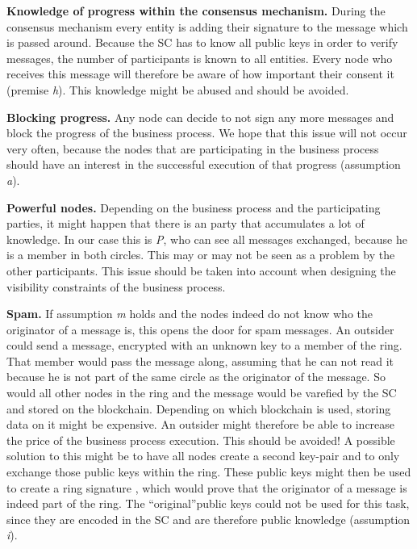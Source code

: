 \documentclass[runningheads]{llncs}
\newcommand{\ber}[1]{\textit{#1}}
\renewcommand{\bigbreak}{}
\newcommand{\quotel}{``}
\newcommand{\quoter}{''}
\begin{document}
\bigbreak
\textbf{Knowledge of progress within the consensus mechanism.} During the consensus mechanism every entity is adding their signature to the message which is passed around. Because the SC has to know all public keys in order to verify messages, the number of participants is known to all entities. Every node who receives this message will therefore be aware of how important their consent it (premise \ber{h}). This knowledge might be abused and should be avoided.


\bigbreak
\textbf{Blocking progress.} Any node can decide to not sign any more messages and block the progress of the business process. We hope that this issue will not occur very often, because the nodes that are participating in the business process should have an interest in the successful execution of that progress (assumption \ber{a}).


\bigbreak
\textbf{Powerful nodes.} Depending on the business process and the participating parties, it might happen that there is an party that accumulates a lot of knowledge. In our case this is \ber{P}, who can see all messages exchanged, because he is a member in both circles. This may or may not be seen as a problem by the other participants. This issue should be taken into account when designing the visibility constraints of the business process. 


\bigbreak
\textbf{Spam.} If assumption \ber{m} holds and the nodes indeed do not know who the originator of a message is, this opens the door for spam messages. An outsider could send a message, encrypted with an unknown key to a member of the ring. That member would pass the message along, assuming that he can not read it because he is not part of the same circle as the originator of the message. So would all other nodes in the ring and the message would be varefied by the SC and stored on the blockchain. Depending on which blockchain is used, storing data on it might be expensive. An outsider might therefore be able to increase the price of the business process execution. This should be avoided! A possible solution to this might be to have all nodes create a second key-pair and to only exchange those public keys within the ring. These public keys might then be used to create a ring signature \cite{rivest2001leak}, which would prove that the originator of a message is indeed part of the ring. The \quotel original\quoter  public keys could not be used for this task, since they are encoded in the SC and are therefore public knowledge (assumption \ber{i}). 
\end{document}
